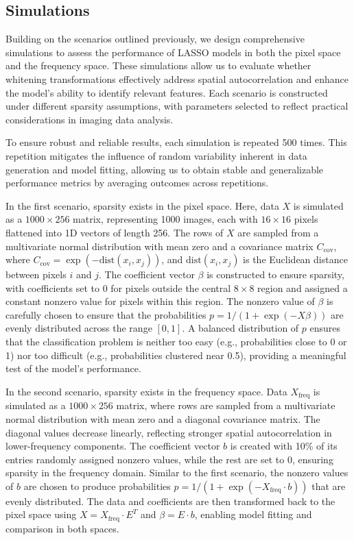 \documentclass[12pt]{article}
\begin{document}
\subsection{Simulations}

Building on the scenarios outlined previously, we design comprehensive simulations to assess the performance of LASSO models in both the pixel space and the frequency space. These simulations allow us to evaluate whether whitening transformations effectively address spatial autocorrelation and enhance the model's ability to identify relevant features. Each scenario is constructed under different sparsity assumptions, with parameters selected to reflect practical considerations in imaging data analysis.

To ensure robust and reliable results, each simulation is repeated 500 times. This repetition mitigates the influence of random variability inherent in data generation and model fitting, allowing us to obtain stable and generalizable performance metrics by averaging outcomes across repetitions.

In the first scenario, sparsity exists in the pixel space. Here, data \( X \) is simulated as a \( 1000 \times 256 \) matrix, representing 1000 images, each with \( 16 \times 16 \) pixels flattened into 1D vectors of length 256. The rows of \( X \) are sampled from a multivariate normal distribution with mean zero and a covariance matrix \( C_{\text{cov}} \), where \( C_{\text{cov}} = \exp(-\text{dist}(x_i, x_j)) \), and \( \text{dist}(x_i, x_j) \) is the Euclidean distance between pixels \( i \) and \( j \). The coefficient vector \( \beta \) is constructed to ensure sparsity, with coefficients set to 0 for pixels outside the central \( 8 \times 8 \) region and assigned a constant nonzero value for pixels within this region. The nonzero value of \( \beta \) is carefully chosen to ensure that the probabilities \( p = 1 / (1 + \exp(-X \beta)) \) are evenly distributed across the range \( [0, 1] \). A balanced distribution of \( p \) ensures that the classification problem is neither too easy (e.g., probabilities close to 0 or 1) nor too difficult (e.g., probabilities clustered near 0.5), providing a meaningful test of the model's performance.

In the second scenario, sparsity exists in the frequency space. Data \( X_{\text{freq}} \) is simulated as a \( 1000 \times 256 \) matrix, where rows are sampled from a multivariate normal distribution with mean zero and a diagonal covariance matrix. The diagonal values decrease linearly, reflecting stronger spatial autocorrelation in lower-frequency components. The coefficient vector \( b \) is created with 10\% of its entries randomly assigned nonzero values, while the rest are set to 0, ensuring sparsity in the frequency domain. Similar to the first scenario, the nonzero values of \( b \) are chosen to produce probabilities \( p = 1 / (1 + \exp(-X_{\text{freq}} \cdot b)) \) that are evenly distributed. The data and coefficients are then transformed back to the pixel space using \( X = X_{\text{freq}} \cdot E^T \) and \( \beta = E \cdot b \), enabling model fitting and comparison in both spaces.
\end{document}
